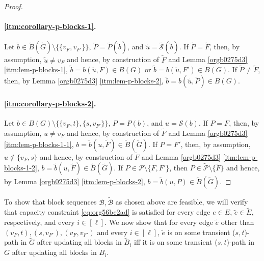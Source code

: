 \documentclass[fontsize=11pt,paper=a4]{book}
\begin{document}
\begin{proof}
~
\paragraph{\ref{itm:corollary-p-blocks-1}.}
Let \(\tilde{b}\in\tilde{B}(\tilde{G})\setminus\{\{v_F,v_{F'}\}\}\), \(\tilde{P}=\tilde{P}(\tilde{b})\), and \(\tilde{u}=\tilde{\mathcal{S}}(\tilde{b})\).
If \(\tilde{P}=\tilde{F}\), then, by assumption, \(\tilde{u}\neq v_F\) and hence, by construction of \(\tilde{F}\) and Lemma \ref{orgb0275d3} \ref{itm:lem-p-blocks-1}, \(\tilde{b}=b(\tilde{u},F)\in B(G)\) or \(\tilde{b}=b(\tilde{u},F')\in B(G)\).
If \(\tilde{P}\neq\tilde{F}\), then, by Lemma \ref{orgb0275d3} \ref{itm:lem-p-blocks-2}, \(\tilde{b}=b(\tilde{u},\tilde{P})\in B(G)\).


\paragraph{\ref{itm:corollary-p-blocks-2}.}
Let \(b\in B(G)\setminus\{\{v_F,t\},\{s,v_{F'}\}\}\), \(P=P(b)\), and \(u=\mathcal{S}(b)\).
If \(P=F\), then, by assumption, \(u\neq v_F\) and hence, by construction of \(\tilde{F}\) and Lemma \ref{orgb0275d3} \ref{itm:lem-p-blocks-1-1}, \(b=\tilde{b}(u,\tilde{F})\in\tilde{B}(\tilde{G})\).
If \(P=F'\), then, by assumption, \(u\notin\{v_F,s\}\) and hence, by construction of \(\tilde{F}\) and Lemma \ref{orgb0275d3} \ref{itm:lem-p-blocks-1-2}, \(b=\tilde{b}(u,\tilde{F})\in\tilde{B}(\tilde{G})\).
If \(P\in\mathcal{P}\setminus\{F,F'\}\), then \(P\in\tilde{\mathcal{P}}\setminus\{\tilde{F}\}\) and hence, by Lemma \ref{orgb0275d3} \ref{itm:lem-p-blocks-2}, \(b=\tilde{b}(u,P)\in\tilde{B}(\tilde{G})\).
\end{proof}

To show that block sequences \(\mathcal{B},\tilde{\mathcal{B}}\) as chosen above are feasible, we will verify that capacity constraint \ref{eq:org56be2ad} is satisfied for every edge \(e\in E\), \(\tilde{e}\in\tilde{E}\), respectively, and every \(i\in[\ell]\).
We now show that for every edge \(\tilde{e}\) other than \((v_F,t),(s,v_{F'}),(v_F,v_{F'})\) and every \(i\in[\ell]\), \(\tilde{e}\) is on some transient (\(s,t\))-path in \(\tilde{G}\) after updating all blocks in \(\tilde{B}_i\) iff it is on some transient (\(s,t\))-path in \(G\) after updating all blocks in \(B_i\).
\end{document}
